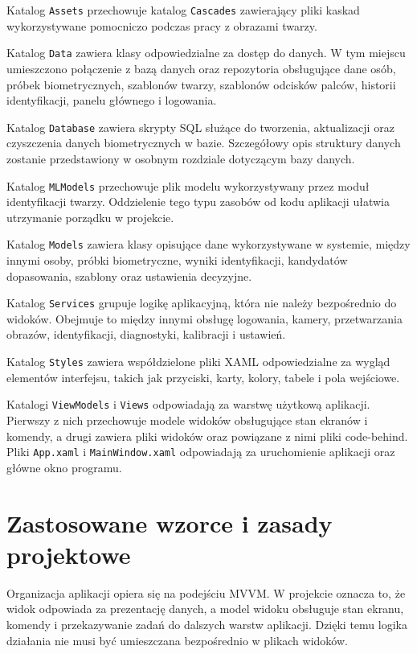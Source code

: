 Katalog \texttt{Assets} przechowuje katalog \texttt{Cascades} zawierający pliki kaskad wykorzystywane pomocniczo podczas pracy z obrazami twarzy.

Katalog \texttt{Data} zawiera klasy odpowiedzialne za dostęp do danych. W tym miejscu umieszczono połączenie z bazą danych oraz repozytoria obsługujące dane osób, próbek biometrycznych, szablonów twarzy, szablonów odcisków palców, historii identyfikacji, panelu głównego i logowania.

Katalog \texttt{Database} zawiera skrypty SQL służące do tworzenia, aktualizacji oraz czyszczenia danych biometrycznych w bazie. Szczegółowy opis struktury danych zostanie przedstawiony w osobnym rozdziale dotyczącym bazy danych.

Katalog \texttt{MLModels} przechowuje plik modelu wykorzystywany przez moduł identyfikacji twarzy. Oddzielenie tego typu zasobów od kodu aplikacji ułatwia utrzymanie porządku w projekcie.

Katalog \texttt{Models} zawiera klasy opisujące dane wykorzystywane w systemie, między innymi osoby, próbki biometryczne, wyniki identyfikacji, kandydatów dopasowania, szablony oraz ustawienia decyzyjne.

Katalog \texttt{Services} grupuje logikę aplikacyjną, która nie należy bezpośrednio do widoków. Obejmuje to między innymi obsługę logowania, kamery, przetwarzania obrazów, identyfikacji, diagnostyki, kalibracji i ustawień.

Katalog \texttt{Styles} zawiera współdzielone pliki XAML odpowiedzialne za wygląd elementów interfejsu, takich jak przyciski, karty, kolory, tabele i pola wejściowe.

Katalogi \texttt{ViewModels} i \texttt{Views} odpowiadają za warstwę użytkową aplikacji. Pierwszy z nich przechowuje modele widoków obsługujące stan ekranów i komendy, a drugi zawiera pliki widoków oraz powiązane z nimi pliki code-behind. Pliki \texttt{App.xaml} i \texttt{MainWindow.xaml} odpowiadają za uruchomienie aplikacji oraz główne okno programu.

\section{Zastosowane wzorce i zasady projektowe}

Organizacja aplikacji opiera się na podejściu MVVM. W projekcie oznacza to, że widok odpowiada za prezentację danych, a model widoku obsługuje stan ekranu, komendy i przekazywanie zadań do dalszych warstw aplikacji. Dzięki temu logika działania nie musi być umieszczana bezpośrednio w plikach widoków.

